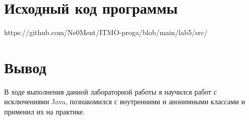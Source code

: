 \documentclass[12pt,onecolumn]{article}
\begin{document}
\section{Исходный код программы}
https://github.com/Ne0Ment/ITMO-proga/blob/main/lab5/src/
\section{Вывод}
В ходе выполнения данной лабораторной работы я научился работ с исключениями Java, познакомился с внутренними и анонимными классами и применил их на практике. \\
\end{document}
